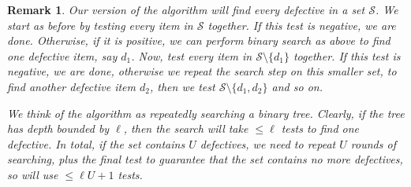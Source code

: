\documentclass[conference]{IEEEtran}
\newtheorem{remark}[theorem]{Remark}
\newcommand{\setS}{{\mathcal{S}}}
\begin{document}
\begin{remark} \label{rem:algo}
Our version of the algorithm will find every defective in a set $\setS$. We start as before by testing every item in $\setS$ together. If this test is negative, we are done.
Otherwise, if it is positive, we can perform binary search as above to find one defective item, say $d_1$. Now, test every item in $\setS \setminus \{ d_1 \}$ together.
If this test is negative, we are done, otherwise we repeat the search step on this smaller set, to find another defective item
$d_2$, then we test $\setS \setminus \{ d_1, d_2 \}$ and so on.

We think of the algorithm as repeatedly searching a binary tree. Clearly, if the tree has depth bounded by $\ell$, then the search will take $ \leq \ell$ tests to find one defective. In total, 
if the set contains $U$ defectives, we need to repeat $U$ rounds of searching, plus the final test to guarantee that the set contains no more defectives, so will use $\leq \ell U + 1$ tests.
\end{remark}
\end{document}
